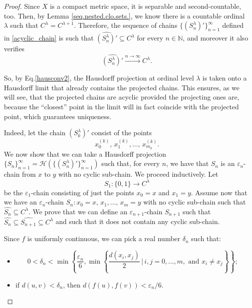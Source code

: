 \documentclass[10pt,a4paper]{article}
\theoremstyle{definition}
\theoremstyle{remark}
\theoremstyle{plain}
\begin{document}
\begin{proof}
    Since $X$ is a compact metric space, it is separable and second-countable, too. Then, by Lemma \ref{seq.nested.clo.sets.}, we know there is a countable ordinal $\lambda$ such that $C^\lambda=C^{\lambda+1}$. Therefore, the sequence of chains $\{({S^\lambda_n})'\}_{n=1}^{\infty}$ defined in \eqref{acyclic_chain} is such that $\widehat{({S^\lambda_n})'}\subseteq C^\lambda$ for every $n\in\mathbb{N}$, and moreover it also verifies
    \begin{equation}\label{hausconv2}        \widehat{({S^\lambda_n})'}\xrightarrow{n\to\infty}C^\lambda.
    \end{equation}

   So, by Eq.\eqref{hausconv2}, the Hausdorff projection at ordinal level $\lambda$ is taken onto a Hausdorff limit that already contains the projected chains. This ensures, as we will see, that the projected chains are acyclic provided the projecting ones are, because the “closest” point in the limit will in fact coincide with the projected point, which guarantees uniqueness.
    
    Indeed, let the chain $({S^\lambda_k})'$ consist of the points $$x_0^{(k)},\,x_1^{(k)},\dots,\,x^{(k)}_{m_k}.$$
    We now show that we can take a Hausdorff projection $\{S_n\}_{n=1}^\infty=\mathcal{H}(\{({S^\lambda_n})'\}_{n=1}^\infty)$ such that, for every $n$, we have that $S_n$ is an $\varepsilon_n$-chain from $x$ to $y$ with no cyclic sub-chain. We proceed inductively. Let $$S_1:\{0,1\}\longrightarrow C^\lambda$$ be the $\varepsilon_1$-chain consisting of just the points $x_0=x$ and $x_1=y$. Assume now that we have an $\varepsilon_n$-chain $S_n:x_0=x,\,x_1,\dots,\,x_m=y$ with no cyclic sub-chain such that $\widehat{S_n}\subseteq C^\lambda$. We prove that we can define an $\varepsilon_{n+1}$-chain $S_{n+1}$ such that $\widehat{S_n}\subseteq\widehat{S_{n+1}}\subseteq C^\lambda$ and such that it does not contain any cyclic sub-chain.

    Since $f$ is uniformly continuous, we can pick a real number $\delta_n$ such that:
    \begin{itemize}
        \item \begin{equation}\label{cond_delta_n_2}
            0<\delta_n<\min\left\{\frac{\varepsilon_n}{6},\min\left\{\frac{d(x_{i},x_{j})}{2}\,\Bigg\vert\,i,j=0,\dots,m,\text{ and }x_i\neq x_j\right\}\right\};
        \end{equation}
        \item if $d(u,v)<\delta_n$, then $d(f(u),f(v))<\varepsilon_n/6$.
    \end{itemize}


\end{proof}
\end{document}
